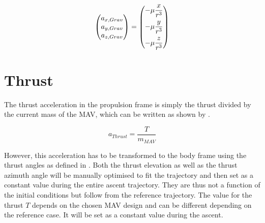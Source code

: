 \begin{equation} \label{eq:gravityModel}
\begin{pmatrix}
a_{x,Grav}\\
a_{y,Grav}\\
a_{z,Grav}\\
\end{pmatrix}
=
\begin{pmatrix}
-\mu\dfrac{x}{r^{3}} \vspace{5pt} \\ \vspace{5pt} 
-\mu\dfrac{y}{r^{3}}\\
-\mu\dfrac{z}{r^{3}}\\
\end{pmatrix}
\end{equation}





\section{Thrust}
\label{sec:thrustModel}
The thrust acceleration in the propulsion frame is simply the thrust divided by the current mass of the \ac{MAV}, which can be written as shown by .

\begin{equation} \label{eq:thrustModel}
a_{Thrust}=\dfrac{T}{m_{MAV}}
\end{equation}

\noindent
However, this acceleration has to be transformed to the body frame using the thrust angles as defined in . Both the thrust elevation as well as the thrust azimuth angle will be manually optimised to fit the trajectory and then set as a constant value during the entire ascent trajectory. They are thus not a function of the initial conditions but follow from the reference trajectory. The value for the thrust $T$ depends on the chosen \ac{MAV} design and can be different depending on the reference case. It will be set as a constant value during the ascent. 

